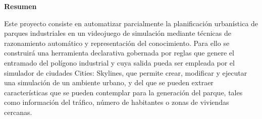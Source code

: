 \vspace*{4em}
{\Huge\bfseries{Resumen}\par}
\vspace*{2em}
{Este proyecto consiste en automatizar parcialmente la planificación urbanística de parques industriales en un videojuego de simulación mediante técnicas de razonamiento automático y representación del conocimiento. Para ello se construirá una herramienta declarativa gobernada por reglas que genere el entramado del polígono industrial y cuya salida pueda ser empleada por el simulador de ciudades Cities: Skylines, que permite crear, modificar y ejecutar una simulación de un ambiente urbano, y del que se pueden extraer características que se pueden contemplar para la generación del parque, tales como información del tráfico, número de habitantes o zonas de viviendas cercanas.\par}
\vspace*{\fill}